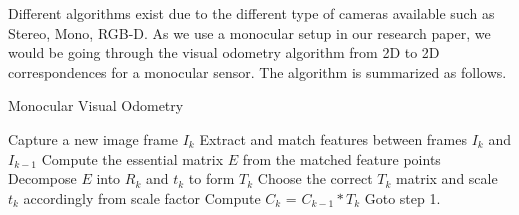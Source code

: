 Different algorithms exist due to the different type of cameras available such as Stereo, Mono, RGB-D. As we use a monocular setup in our research paper, we would be going through the visual odometry algorithm from 2D to 2D correspondences for a monocular sensor. The algorithm is summarized as follows.

\begin{algorithm}
    \caption{Monocular Visual Odometry}
	\begin{algorithmic}[1]
		\STATE Capture a new image frame $I_k$
    	\STATE Extract and match features between frames $I_k$ and $I_{k-1}$
    	\STATE Compute the essential matrix $E$ from the matched feature points
    	\STATE Decompose $E$ into $R_k$ and $t_k$ to form $T_k$
    	\STATE Choose the correct $T_k$ matrix and scale $t_k$ accordingly from scale factor
    	\STATE Compute $C_k$ = $C_{k-1}*T_k$
    	\STATE Goto step 1.
	\end{algorithmic}
\end{algorithm}

